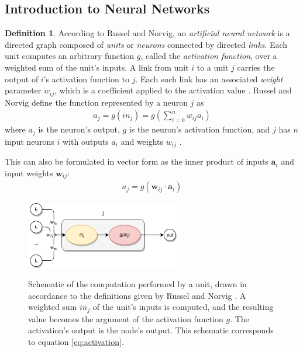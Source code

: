 \documentclass[12pt, titlepage]{report}
\theoremstyle{definition}
\newtheorem{definition}{Definition}
\begin{document}
\subsection{Introduction to Neural Networks}\label{subsection:neural_intro}
\begin{definition}
According to Russel and Norvig, an \emph{artificial neural network} is a directed graph composed of \emph{units} or \emph{neurons} connected by directed \emph{links}. Each unit computes an arbitrary function $g$, called the \emph{activation function}, over a weighted sum of the unit's inputs. A link from unit $i$ to a unit $j$ carries the output of $i$'s activation function to $j$. Each such link has an associated \emph{weight} parameter $w_{ij}$, which is a coefficient applied to the activation value \cite[p. 727-731]{russel2009artificial}. Russel and Norvig define the function represented by a neuron $j$ as
\begin{gather}\label{eq:activation}
a_j = g(in_j) = g\left(\sum_{i=0}^{n} w_{ij}a_i\right)
\end{gather}
where $a_j$ is the neuron's output, $g$ is the neuron's activation function, and $j$ has $n$ input neurons $i$ with outputs $a_i$ and weights $w_{ij}$ \cite[p. 728]{russel2009artificial}.
\end{definition}

This can also be formulated in vector form as the inner product of inputs $\bm{a}_i$ and input weights $\bm{w}_{ij}$:
\begin{gather}\label{eq:activation_vector}
a_j = g(\bm{w}_{ij}\cdot\bm{a}_i)
\end{gather}

\begin{figure}
\centering
\includegraphics[width=0.6\textwidth]{img/neuron.png}\\
\caption[Neural network unit]{Schematic of the computation performed by a unit, drawn in accordance to the definitions given by Russel and Norvig \cite[p.728]{russel2009artificial}. A weighted sum $in_j$ of the unit's inputs is computed, and the resulting value becomes the argument of the activation function $g$. The activation's output is the node's output. This schematic corresponds to equation \ref{eq:activation}.}
\label{figure:neural_unit}
\end{figure}
\end{document}
